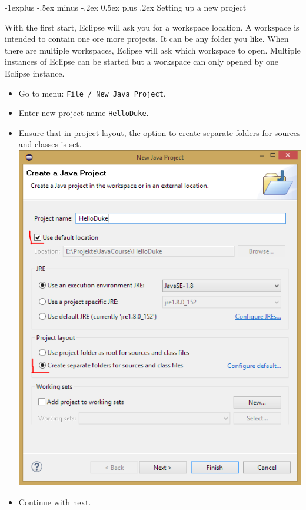 \documentclass[10pt,landscape]{article}
\makeatletter
\renewcommand{\subsection}{\@startsection{subsection}{2}{0mm}%
                                {-1explus -.5ex minus -.2ex}%
                                {0.5ex plus .2ex}%
                                {\normalfont\normalsize\bfseries}}
\makeatother
\begin{document}
\begin{multicols}{2}
\subsection{Setting up a new project}
\begin{multicols}{2}
With the first start, Eclipse will ask you for a workspace location. A workspace is intended to contain one ore more projects. It can be any folder you like. When there are multiple workspaces, Eclipse will ask which workspace to open. Multiple instances of Eclipse can be started but a workspace can only opened by one Eclipse instance.\\
\begin{itemize}
\item Go to menu: \texttt{File / New Java Project}.
\item Enter new project name \texttt{HelloDuke}.
\item Ensure that in project layout, the option to create separate folders for sources and classes is set. \includegraphics[width=1\linewidth]{../slides/EclipseProjectWizard1.png}\\
\item Continue with next.

\end{itemize}
\end{multicols}
\end{multicols}
\end{document}
